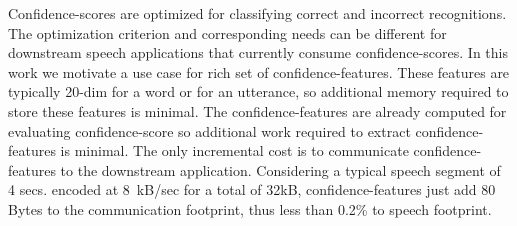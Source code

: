 Confidence-scores are optimized for classifying correct and incorrect recognitions. The optimization criterion and corresponding needs can be different for downstream speech applications that currently consume confidence-scores. In this work we motivate a use case for rich set of confidence-features. These features are typically 20-dim for a word or for an utterance, so additional memory required to store these features is minimal. The confidence-features are already computed for evaluating confidence-score so additional work required to extract confidence-features is minimal. The only incremental cost is to communicate confidence-features to the downstream application. Considering a typical speech segment of 4 secs. encoded at 8~kB/sec for a total of 32kB, confidence-features just add 80 Bytes to the communication footprint, thus less than 0.2\% to speech footprint.
